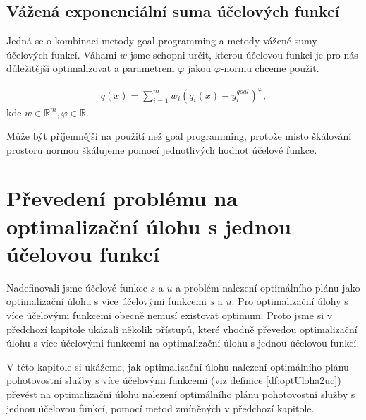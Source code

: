 \subsection{Vážená exponenciální suma účelových funkcí}\label{kap:vazenaSumUcF}

Jedná se o kombinaci metody goal programming a metody vážené sumy účelových funkcí.
Váhami $w$ jsme schopni určit, kterou účelovou funkci je pro nás důležitější optimalizovat a parametrem $\varphi$ jakou $\varphi$-normu chceme použít.

\begin{definice}\label{df:vazenaSumUcF}
  \begin{align*}
    q(x) = \sum_{i=1}^{m} w_i (q_i(x) - y_i^{goal})^\varphi,
  \end{align*}
  kde $w \in \mathbb{R}^m, \varphi \in \mathbb{R}$.
\end{definice}

Může být příjemnější na použití než goal programming, protože místo škálování prostoru normou škálujeme pomocí jednotlivých hodnot účelové funkce.

\section{Převedení problému na optimalizační úlohu s jednou účelovou funkcí}\label{kap:opt1Uc}

Nadefinovali jsme účelové funkce $s$ a $u$ a problém nalezení optimálního plánu jako optimalizační úlohu s více účelovými funkcemi $s$ a $u$.
Pro optimalizační úlohy s více účelovými funkcemi obecně nemusí existovat optimum.
Proto jsme si v předchozí kapitole ukázali několik přístupů,
které vhodně převedou optimalizační úlohu s více účelovými funkcemi na optimalizační úlohu s jednou účelovou funkcí.

V této kapitole si ukážeme, jak optimalizační úlohu nalezení optimálního plánu pohotovostní služby s více účelovými funkcemi (viz definice \ref{df:optUloha2uc}) převést na
optimalizační úlohu nalezení optimálního plánu pohotovostní služby s jednou účelovou funkcí, pomocí metod zmíněných v předchozí kapitole.

